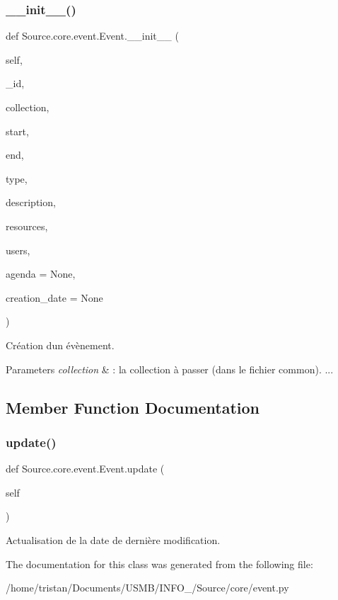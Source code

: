 \subsubsection{\texorpdfstring{\+\_\+\+\_\+init\+\_\+\+\_\+()}{\_\_init\_\_()}}
{\footnotesize\ttfamily def Source.\+core.\+event.\+Event.\+\_\+\+\_\+init\+\_\+\+\_\+ (\begin{DoxyParamCaption}\item[{}]{self,  }\item[{}]{\+\_\+id,  }\item[{}]{collection,  }\item[{}]{start,  }\item[{}]{end,  }\item[{}]{type,  }\item[{}]{description,  }\item[{}]{resources,  }\item[{}]{users,  }\item[{}]{agenda = {\ttfamily None},  }\item[{}]{creation\+\_\+date = {\ttfamily None} }\end{DoxyParamCaption})}



Création d\textquotesingle{}un évènement. 


\begin{DoxyParams}{Parameters}
{\em collection} & \+: la collection à passer (dans le fichier common). ... \\
\hline
\end{DoxyParams}


\subsection{Member Function Documentation}
\mbox{\label{classSource_1_1core_1_1event_1_1Event_ac97a1c0a1f4e7b5a96d4584c6c623f75}} 
\subsubsection{\texorpdfstring{update()}{update()}}
{\footnotesize\ttfamily def Source.\+core.\+event.\+Event.\+update (\begin{DoxyParamCaption}\item[{}]{self }\end{DoxyParamCaption})}



Actualisation de la date de dernière modification. 



The documentation for this class was generated from the following file\+:\begin{DoxyCompactItemize}
\item 
/home/tristan/\+Documents/\+U\+S\+M\+B/\+I\+N\+F\+O\+\_/\+Source/core/event.\+py\end{DoxyCompactItemize}
